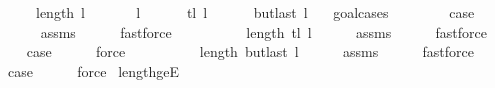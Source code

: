 \begin{isabellebody}
\ \ \ {\isachardoublequoteopen}{}\ {\isasymle}\ length\ l{\isachardoublequoteclose}\isanewline
\ \ \isanewline
\ \ \ \ {\isachardoublequoteopen}l\ {\isasymnoteq}\ {\isacharbrackleft}{\kern0pt}{\isacharbrackright}{\kern0pt}{\isachardoublequoteclose}\isanewline
\ \ \ \ {\isachardoublequoteopen}tl\ l\ {\isasymnoteq}\ {\isacharbrackleft}{\kern0pt}{\isacharbrackright}{\kern0pt}{\isachardoublequoteclose}\isanewline
\ \ \ \ {\isachardoublequoteopen}butlast\ l\ {\isasymnoteq}\ {\isacharbrackleft}{\kern0pt}{\isacharbrackright}{\kern0pt}{\isachardoublequoteclose}%
\endisataginvisible
{\isafoldinvisible}%
%
\isadeliminvisible
\isanewline
%
\endisadeliminvisible
%
\isadelimproof
%
\endisadelimproof
%
\isatagproof
{}\isamarkupfalse%
\ {\isacharparenleft}{\kern0pt}goal{\isacharunderscore}{\kern0pt}cases{\isacharparenright}{\kern0pt}\isanewline
\ \ \isamarkupfalse%
\ {}\isanewline
\ \ \isamarkupfalse%
\ {\isacharquery}{\kern0pt}case\isanewline
\ \ \ \ \isamarkupfalse%
\ assms\isanewline
\ \ \ \ \isamarkupfalse%
\ fastforce\isanewline
{}\isamarkupfalse%
\isanewline
\ \ \isamarkupfalse%
\ {}\isanewline
\ \ \isamarkupfalse%
\ {\isachardoublequoteopen}{}\ {\isasymle}\ length\ {\isacharparenleft}{\kern0pt}tl\ l{\isacharparenright}{\kern0pt}{\isachardoublequoteclose}\isanewline
\ \ \ \ \isamarkupfalse%
\ assms\isanewline
\ \ \ \ \isamarkupfalse%
\ fastforce\isanewline
\ \ \isamarkupfalse%
\ {\isacharquery}{\kern0pt}case\isanewline
\ \ \ \ \isamarkupfalse%
\ force\isanewline
{}\isamarkupfalse%
\isanewline
\ \ \isamarkupfalse%
\ {}\isanewline
\ \ \isamarkupfalse%
\ {\isachardoublequoteopen}{}\ {\isasymle}\ length\ {\isacharparenleft}{\kern0pt}butlast\ l{\isacharparenright}{\kern0pt}{\isachardoublequoteclose}\isanewline
\ \ \ \ \isamarkupfalse%
\ assms\isanewline
\ \ \ \ \isamarkupfalse%
\ fastforce\isanewline
\ \ \isamarkupfalse%
\ {\isacharquery}{\kern0pt}case\isanewline
\ \ \ \ \isamarkupfalse%
\ force\isanewline
{}\isamarkupfalse%
%
\endisatagproof
{\isafoldproof}%
%
\isadelimproof
\isanewline
%
\endisadelimproof
%
\isadeliminvisible
\isanewline
%
\endisadeliminvisible
%
\isataginvisible
{}\isamarkupfalse%
\ length{\isacharunderscore}{\kern0pt}ge{\isacharunderscore}{\kern0pt}{}E{\isacharcolon}{\kern0pt}\isanewline

\end{isabellebody}

